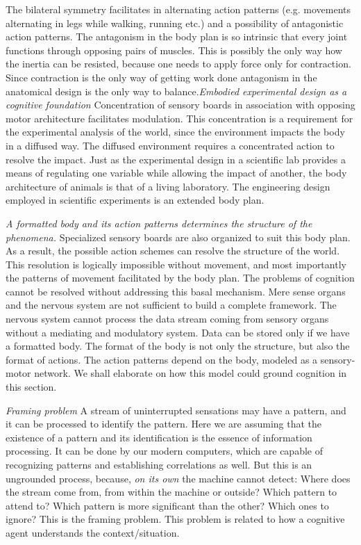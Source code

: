 The bilateral symmetry facilitates in alternating action patterns (e.g. movements alternating in legs while walking, running etc.) and a possibility of antagonistic action patterns. The antagonism in the body plan is so intrinsic that every joint functions through opposing pairs of muscles. This is possibly the only way how the inertia can be resisted, because one needs to apply force only for contraction. Since contraction is the only way of getting work done antagonism in the anatomical design is the only way to balance.\emph{Embodied experimental design as a cognitive foundation} Concentration of sensory boards in association with opposing motor architecture facilitates modulation. This concentration is a requirement for the experimental analysis of the world, since the environment impacts the body in a diffused way. The diffused environment requires a concentrated action to resolve the impact. Just as the experimental design in a scientific lab provides a means of regulating one variable while allowing the impact of another, the body architecture of animals is that of a living laboratory. The engineering design employed in scientific experiments is an extended body plan.

\emph{A formatted body and its action patterns determines the structure of the phenomena.} Specialized sensory boards are also organized to suit this body plan. As a result, the possible action schemes can resolve the structure of the world. This resolution is logically impossible without movement, and most importantly the patterns of movement facilitated by the body plan. The problems of cognition cannot be resolved without addressing this basal mechanism. Mere sense organs and the nervous system are not sufficient to build a complete framework. The nervous system cannot process the data stream coming from sensory organs without a mediating and modulatory system. Data can be stored only if we have a formatted body. The format of the body is not only the structure, but also the format of actions. The action patterns depend on the body, modeled as a sensory-motor network.  We shall elaborate on how this model could ground cognition in this section.

\emph{Framing problem} A stream of uninterrupted sensations may have a pattern, and it can be processed to identify the pattern. Here we are assuming that the existence of a pattern and its identification is the essence of information processing. It can be done by our modern computers, which are capable of recognizing patterns and establishing correlations as well. But this is an ungrounded process, because, \textit{on its own} the machine cannot detect: Where does the stream come from, from within the machine or outside? Which pattern to attend to? Which pattern is more significant than the other? Which ones to ignore? This is the framing problem. This problem is related to how a cognitive agent understands the context/situation.

